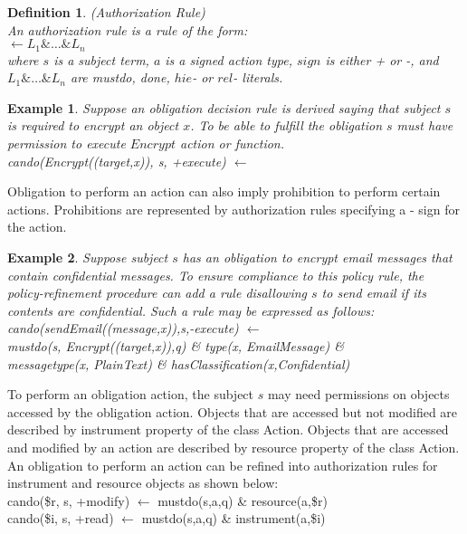 \documentclass[12pt,journal,letterpaper,onecolumn]{IEEEtran}
\newtheorem{definition}{Definition}[section]
\newtheorem{example}{Example}[section]
\begin{document}
\begin{definition}(Authorization Rule)\\
An {\em authorization rule} is a rule of the form: \\
\indent \indent {} $\leftarrow L_1 \& \ldots \& L_n$ \\
where $s$ is a subject term, $a$ is a signed action type, $sign$ is
either + or -, and $L_1 \& \ldots \& L_n$ are {\ttfamily mustdo,
done}, $hie$- or $rel$- literals. \label{def:authorizationrule}
\end{definition}

\begin{example} Suppose an obligation decision rule is derived
saying that subject $s$ is required to encrypt an object $x$. To be
able to fulfill the obligation $s$ must have permission to execute
$Encrypt$ action or function. \\
{\ttfamily cando(Encrypt((target,x)), s, +execute)} $\leftarrow$\\
\indent \indent {}
\label{eg:derivecando}
\end{example}

Obligation to perform an action can also imply prohibition to
perform certain actions. Prohibitions are represented by
authorization rules specifying a - sign for the action.

\begin{example}
Suppose subject $s$ has an obligation to encrypt email messages that
contain confidential messages. To ensure compliance to this policy
rule, the policy-refinement procedure can add a rule disallowing $s$
to send email if its contents are confidential. Such a rule may be
expressed as
follows:\\
{\ttfamily cando(sendEmail((message,x)),s,-execute) $\leftarrow$ \\
\indent\indent  mustdo(s, Encrypt((target,x)),q) \& type(x,
EmailMessage) \& \\
\indent\indent  messagetype(x, PlainText) \&
hasClassification(x,Confidential)} \label{eg:deriveprohibition}
\end{example}

To perform an obligation action, the subject $s$ may need
permissions on objects accessed by the obligation action. Objects
that are accessed but not modified are described by {\ttfamily
instrument} property of the class {\ttfamily Action}. Objects that
are accessed and modified by an action are described by {\ttfamily
resource} property of the class {\ttfamily Action}. An obligation to
perform an action can be refined into authorization rules for
instrument and resource objects as shown below: \\
 {\ttfamily cando(\$r, s, +modify) $\leftarrow$ mustdo(s,a,q) \&
 resource(a,\$r)}\\
 {\ttfamily cando(\$i, s, +read) $\leftarrow$ mustdo(s,a,q) \& instrument(a,\$i)}
\end{document}
